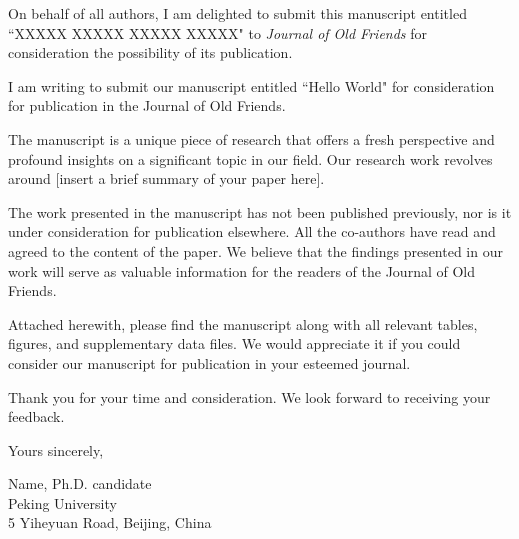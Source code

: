 \documentclass{article}
\begin{document}
On behalf of all authors, I am delighted to submit this manuscript entitled ``XXXXX XXXXX XXXXX XXXXX" to \textit{Journal of Old Friends} for consideration the possibility of its publication.

I am writing to submit our manuscript entitled ``Hello World" for consideration for publication in the Journal of Old Friends.

The manuscript is a unique piece of research that offers a fresh perspective and profound insights on a significant topic in our field. Our research work revolves around [insert a brief summary of your paper here].

The work presented in the manuscript has not been published previously, nor is it under consideration for publication elsewhere. All the co-authors have read and agreed to the content of the paper. We believe that the findings presented in our work will serve as valuable information for the readers of the Journal of Old Friends.

Attached herewith, please find the manuscript along with all relevant tables, figures, and supplementary data files. We would appreciate it if you could consider our manuscript for publication in your esteemed journal.

Thank you for your time and consideration. We look forward to receiving your feedback.

\bigskip %

Yours sincerely,

\vspace{20pt} %


Name, Ph.D. candidate \\
Peking University \\
5 Yiheyuan Road, Beijing, China
\end{document}
